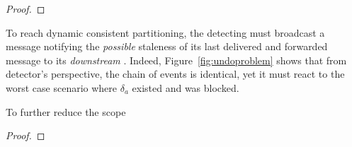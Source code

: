 \begin{proof}
\end{proof}

To reach dynamic consistent partitioning, the detecting \process must
broadcast a message notifying the \emph{possible} staleness of its
last delivered and forwarded message to its \emph{downstream}
\processes. Indeed, Figure~\ref{fig:undoproblem} shows that from
detector's perspective, the chain of events is identical, yet it must
react to the worst case scenario where $\delta_a$ existed and was
blocked.   

\begin{definition}
  To further reduce the scope  
\end{definition}

\begin{theorem}
\end{theorem}

\begin{proof}
\end{proof}



